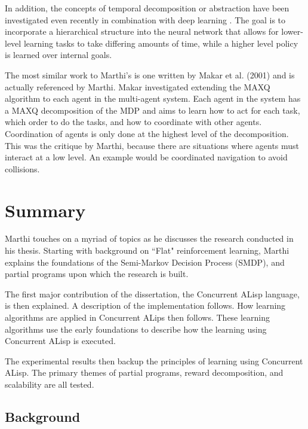 \documentclass[jair,twoside,11pt,theapa]{article}
\begin{document}
In addition, the concepts of temporal decomposition or abstraction have been investigated even recently in combination with deep learning \cite{Kulkarni:2016}. The goal is to incorporate a hierarchical structure into the neural network that allows for lower-level learning tasks to take differing amounts of time, while a higher level policy is learned over internal goals. 

The most similar work to Marthi's is one written by Makar et al. (2001) \cite{Makar:2001} and is actually referenced by Marthi. Makar investigated extending the MAXQ algorithm to each agent in the multi-agent system. Each agent in the system has a MAXQ decomposition of the MDP and aims to learn how to act for each task, which order to do the tasks, and how to coordinate with other agents. Coordination of agents is only done at the highest level of the decomposition. This was the critique by Marthi, because there are situations where agents must interact at a low level. An example would be coordinated navigation to avoid collisions. 


\section{Summary}
\label{Summary}
Marthi touches on a myriad of topics as he discusses the research conducted in his thesis. Starting with background on ``Flat" reinforcement learning, Marthi explains the foundations of the Semi-Markov Decision Process (SMDP), and partial programs upon which the research is built.

The first major contribution of the dissertation, the Concurrent ALisp language, is then explained. A description of the implementation follows. How learning algorithms are applied in Concurrent ALips then follows. These learning algorithms use the early foundations to describe how the learning using Concurrent ALisp is executed.

The experimental results then backup the principles of learning using Concurrent ALisp. The primary themes of partial programs, reward decomposition, and scalability are all tested.

\subsection{Background}
\label{Background}
\end{document}
